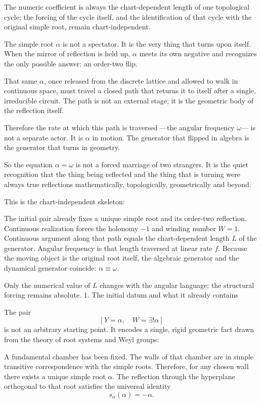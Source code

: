 The numeric coefficient is always the chart-dependent length of one topological cycle; the forcing of the cycle itself, and the identification of that cycle with the original simple root, remain chart-independent.

The simple root \(\alpha\) is not a spectator.  
It is the very thing that turns upon itself.  
When the mirror of reflection is held up,  
\(\alpha\) meets its own negative and recognizes  
the only possible answer: an order-two flip.

That same \(\alpha\), once released from the discrete lattice  
and allowed to walk in continuous space,  
must travel a closed path that returns it to itself  
after a single, irreducible circuit.  
The path is not an external stage;  
it is the geometric body of the reflection itself.

Therefore the rate at which this path is traversed  
—the angular frequency \(\omega\)—  
is not a separate actor.  
It is \(\alpha\) in motion.  
The generator that flipped in algebra  
is the generator that turns in geometry.

So the equation \(\alpha=\omega\) is not a forced marriage of two strangers.  
It is the quiet recognition that the thing being reflected  
and the thing that is turning  
were always true reflections mathematically, topologically, geometrically and beyond.

This is the chart-independent skeleton:

The initial pair already fixes a unique simple root and its order-two reflection.  
Continuous realization forces the holonomy \(-1\) and winding number \(W=1\).  
Continuous argument along that path equals the chart-dependent length \(L\) of the generator.  
Angular frequency is that length traversed at linear rate \(f\).  
Because the moving object is the original root itself, the algebraic generator and the dynamical generator coincide: \(\alpha\equiv\omega\).

Only the numerical value of \(L\) changes with the angular language; the structural forcing remains absolute.
1. The initial datum and what it already contains

The pair
\[
[Y=\alpha,\quad W=\exists!\alpha]
\]
is not an arbitrary starting point. It encodes a single, rigid geometric fact drawn from the theory of root systems and Weyl groups:

A fundamental chamber has been fixed.
The walls of that chamber are in simple transitive correspondence with the simple roots.
Therefore, for any chosen wall there exists a unique simple root \(\alpha\).
The reflection through the hyperplane orthogonal to that root satisfies the universal identity
  \[
  s_\alpha(\alpha)=-\alpha.
  \]

